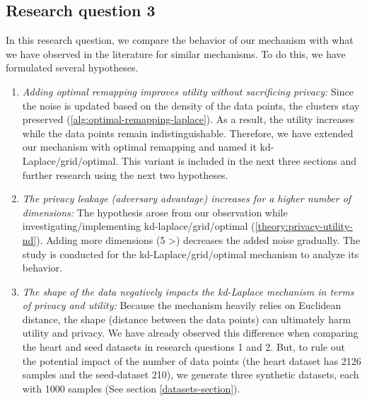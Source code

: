 \subsection{Research question 3} \label{method:research-question-3}
In this research question, we compare the behavior of our mechanism with what we have observed in the literature for similar mechanisms.
To do this, we have formulated several hypotheses.
\begin{enumerate}
  \item \textit{Adding optimal remapping improves utility without sacrificing privacy:}
        Since the noise is updated based on the density of the data points, the clusters stay preserved (\ref{alg:optimal-remapping-laplace}).
        As a result, the utility increases while the data points remain indistinguishable.
        Therefore, we have extended our mechanism with optimal remapping and named it kd-Laplace/grid/optimal.
        This variant is included in the next three sections and further research using the next two hypotheses.
  \item \textit{The privacy leakage (adversary advantage) increases for a higher number of dimensions:}
        The hypothesis arose from our observation while investigating/implementing kd-laplace/grid/optimal (\ref{theory:privacy-utility-nd}).
        Adding more dimensions (5 >) decreases the added noise gradually.
        The study is conducted for the kd-Laplace/grid/optimal mechanism to analyze its behavior.
  \item \textit{The shape of the data negatively impacts the kd-Laplace mechanism in terms of privacy and utility:}
        Because the mechanism heavily relies on Euclidean distance, the shape (distance between the data points) can ultimately harm utility and privacy.
        We have already observed this difference when comparing the heart and seed datasets in research questions 1 and 2.
        But, to rule out the potential impact of the number of data points (the heart dataset has 2126 samples and the seed-dataset 210), we generate three synthetic datasets, each with 1000 samples (See section \ref{datasets-section}).

\end{enumerate}
